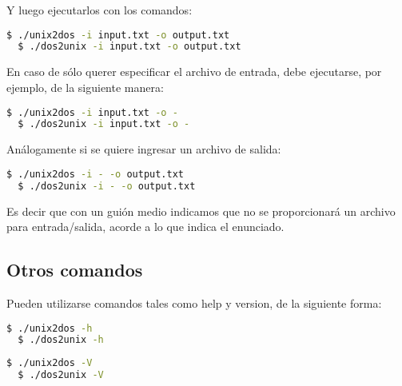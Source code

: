 \documentclass[a4paper]{article}
\begin{document}
Y luego ejecutarlos con los comandos:

\begin{lstlisting}[language=bash]
  $ ./unix2dos -i input.txt -o output.txt
  $ ./dos2unix -i input.txt -o output.txt
\end{lstlisting}

En caso de sólo querer especificar el archivo de entrada, debe ejecutarse, por ejemplo, de la siguiente manera:

\begin{lstlisting}[language=bash]
  $ ./unix2dos -i input.txt -o -
  $ ./dos2unix -i input.txt -o -
\end{lstlisting}

Análogamente si se quiere ingresar un archivo de salida:

\begin{lstlisting}[language=bash]
  $ ./unix2dos -i - -o output.txt
  $ ./dos2unix -i - -o output.txt
\end{lstlisting}

Es decir que con un guión medio indicamos que no se proporcionará un archivo para entrada/salida, acorde a lo que indica el enunciado.

\subsection{Otros comandos}

Pueden utilizarse comandos tales como help y version, de la siguiente forma:

\begin{lstlisting}[language=bash]
  $ ./unix2dos -h
  $ ./dos2unix -h
\end{lstlisting}

\begin{lstlisting}[language=bash]
  $ ./unix2dos -V
  $ ./dos2unix -V
\end{lstlisting}
\end{document}
